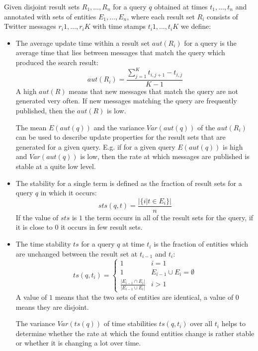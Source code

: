 \documentclass{llncs}
\begin{document}
\begin{definition}
Given disjoint result sets $R_1,\ldots,R_n$ for a query $q$ obtained at times $t_1,\ldots,t_n$ and annotated with sets of entities $E_1,\ldots,E_n$, where each result set $R_i$ consists of Twitter messages $r_i1,\ldots,r_iK$ with time stamps $t_i1,\ldots,t_iK$ we define:
\begin{itemize}
	\item The average update time within a result set $aut(R_i)$ for a query is the average time that lies between messages that match the query which produced the search result: $$aut(R_i)=\frac{\sum_{j=1}^{K}t_{i,j+1}-t_{i,j}}{K-1}$$
	A high $aut(R)$ means that new messages that match the query are not generated very often. If new messages matching the query are frequently published, then the $aut(R)$ is low.
	
	The mean $E(aut(q))$ and the variance $Var(aut(q))$ of the $aut(R_i)$ can be used to describe update properties for the result sets that are generated for a given query. E.g. if for a given query $E(aut(q))$ is high and $Var(aut(q))$ is low, then the rate at which messages are published is stable at a quite low level.
	\item The stability for a single term is defined as the fraction of result sets for a query $q$ in which it occurs: 
$$sts(q,t)=\frac{|\{i|t\in E_i\}|}{n}$$
	If the value of $sts$ is $1$ the term occurs in all of the result sets for the query, if it is close to $0$ it occurs in few result sets.
	\item The time stability $ts$ for a query $q$ at time $t_i$ is the fraction of
	entities which are unchanged between the result set at $t_{i-1}$ and $t_i$: 
	$$ts(q,t_i)=\begin{cases} 1 & i=1 \\
														1 & E_{i-1}\cup E_i = \emptyset\\														
														\frac{|E_{i-1}\cap E_i|}{|E_{i-1}\cup E_i|} & i>1\end{cases}$$
	A value of $1$ means that the two sets of entities are identical, a value of $0$ means they are disjoint.
	
	The variance $Var(ts(q))$ of time stabilities $ts(q,t_i)$ over all $t_i$ helps to determine whether the rate at which the found entities change is rather stable or whether it is changing a lot over time.
\end{itemize}
\end{definition}
\end{document}
